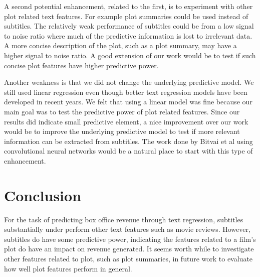\documentclass[11pt]{article}
\begin{document}
A second potential enhancement, related to the first, is to experiment with other
plot related text features. For example plot summaries could be used instead of subtitles.
The relatively weak performance of subtitles could be from a low signal to noise ratio
where much of the predictive information is lost to irrelevant data. A more concise
description of the plot, such as a plot summary, may have a higher signal to noise ratio.
A good extension of our work would be to test if such concise plot features have higher
predictive power.

Another weakness is that we did not change the underlying predictive model. We still
used linear regression even though better text regression models have been developed in
recent years. We felt that using a linear model was fine because our main goal was to
test the predictive power of plot related features. Since our results did indicate small
predictive element, a nice improvement over our work would be to improve the underlying
predictive model to test if more relevant information can be extracted from subtitles.
The work done by Bitvai et al using convolutional neural networks would be a natural place
to start with this type of enhancement. 

\section{Conclusion}
For the task of predicting box office revenue through text regression, subtitles
substantially under perform other text features such as movie reviews. However,
subtitles do have some predictive power, indicating the features related to a film's plot
do have an impact on revenue generated. It seems worth while to investigate other
features related to plot, such as plot summaries, in future work to evaluate how well
plot features perform in general.
\end{document}
